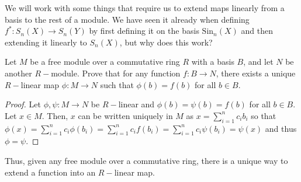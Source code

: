\documentclass[12pt,reqno]{amsart}
\numberwithin{theorem}{section}
\theoremstyle{definition}
\theoremstyle{remark}
\numberwithin{equation}{section}
\theoremstyle{definition}
\newcommand{\Sin}{\mathrm{Sin}}
\begin{document}
    We will work with some things that require us to extend maps linearly from a basis to the rest of a module. We have seen it already when defining $f^*:S_n(X)\rightarrow S_n(Y)$ by first defining it on the basis $\Sin_n(X)$ and then extending it linearly to $S_n(X)$, but why does this work?
\begin{proposition}
    Let $M$ be a free module over a commutative ring $R$ with a basis $B$, and let $N$ be another $R-$module. Prove that for any function $f:B\rightarrow N$, there exists a unique $R-$linear map $\phi:M\rightarrow N$ such that $\phi(b)=f(b)$ for all $b \in B$.
\end{proposition}
\begin{proof}
    Let $\phi,\psi : M \rightarrow N $ be $R-$linear and $\phi(b)=\psi(b)=f(b)$ for all $b \in B$. Let $x \in M$. Then, $x$ can be written uniquely in $M$ as $x = \sum_{i=1}^n c_ib_i $ so that $\phi(x) =  \sum_{i=1}^n c_i\phi (b_i) = \sum_{i=1}^n c_if (b_i)= \sum_{i=1}^n c_i\psi (b_i) =\psi(x)$ and thus $\phi = \psi$.
\end{proof}
Thus, given any free module over a commutative ring, there is a unique way to extend a function into an $R-$linear map.
\end{document}
